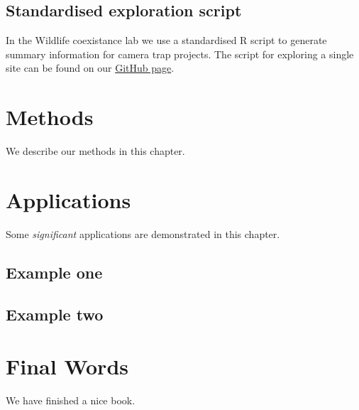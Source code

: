 \documentclass[]{book}
\begin{document}
\section{Standardised exploration
script}\label{standardised-exploration-script}

In the Wildlife coexistance lab we use a standardised R script to
generate summary information for camera trap projects. The script for
exploring a single site can be found on our
\href{https://github.com/WildCoLab/SingleSiteExploration}{GitHub page}.

\chapter{Methods}\label{methods}

We describe our methods in this chapter.

\chapter{Applications}\label{applications}

Some \emph{significant} applications are demonstrated in this chapter.

\section{Example one}\label{example-one}

\section{Example two}\label{example-two}

\chapter{Final Words}\label{final-words}

We have finished a nice book.


\end{document}
